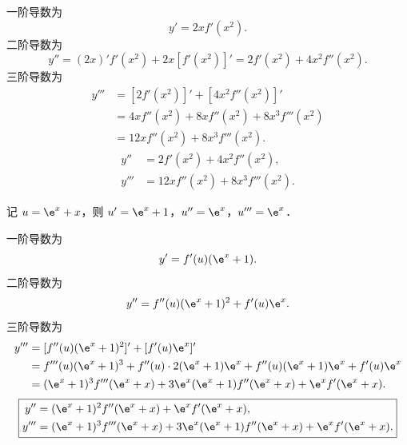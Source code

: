 \begin{solution}

    一阶导数为
    \begin{equation}
        y' = 2x f'(x^2).
    \end{equation}
    二阶导数为
    \begin{equation}
        y'' = (2x)' f'(x^2) + 2x [f'(x^2)]' = 2f'(x^2) + 4x^2 f''(x^2).
    \end{equation}
    三阶导数为
    \begin{equation}
        \begin{aligned}
            y''' & = [2f'(x^2)]' + [4x^2 f''(x^2)]'             \\
                 & = 4x f''(x^2) + 8x f''(x^2) + 8x^3 f'''(x^2) \\
                 & = 12x f''(x^2) + 8x^3 f'''(x^2).
        \end{aligned}
    \end{equation}
    \begin{equation}
        \boxed{
            \begin{aligned}
                y''  & = 2f'(x^2) + 4x^2 f''(x^2),      \\
                y''' & = 12x f''(x^2) + 8x^3 f'''(x^2).
            \end{aligned}
        }
    \end{equation}


    记 $u = \e^x + x$，则 $u' = \e^x + 1$，$u'' = \e^x$，$u''' = \e^x$．

    一阶导数为
    \begin{equation}
        y' = f'(u)(\e^x + 1).
    \end{equation}
    二阶导数为
    \begin{equation}
        y'' = f''(u)(\e^x + 1)^2 + f'(u)\e^x.
    \end{equation}
    三阶导数为
    \begin{equation}
        \begin{aligned}
            y''' & = [f''(u)(\e^x + 1)^2]' + [f'(u)\e^x]'                                                 \\
                 & = f'''(u)(\e^x + 1)^3 + f''(u)\cdot 2(\e^x + 1)\e^x + f''(u)(\e^x + 1)\e^x + f'(u)\e^x \\
                 & = (\e^x + 1)^3 f'''(\e^x + x) + 3\e^x(\e^x + 1) f''(\e^x + x) + \e^x f'(\e^x + x).
        \end{aligned}
    \end{equation}
    \begin{equation}
        \boxed{
            \begin{aligned}
                y''  & = (\e^x + 1)^2 f''(\e^x + x) + \e^x f'(\e^x + x),                                  \\
                y''' & = (\e^x + 1)^3 f'''(\e^x + x) + 3\e^x(\e^x + 1) f''(\e^x + x) + \e^x f'(\e^x + x).
            \end{aligned}
        }
    \end{equation}
\end{solution}

